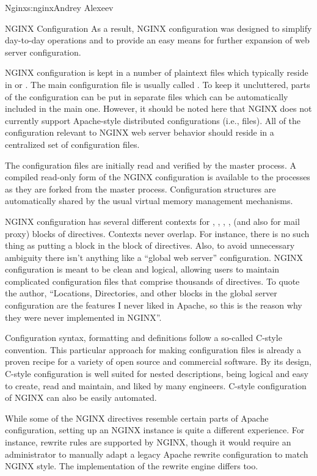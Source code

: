 \begin{aosachapter}{Nginx}{s:nginx}{Andrey Alexeev}
\begin{aosasect1}{NGINX Configuration}
As a result, NGINX configuration was designed to simplify day-to-day
operations and to provide an easy means for further expansion of web
server configuration.

NGINX configuration is kept in a number of plaintext files which
typically reside in  or
. The main configuration file is usually called
. To keep it uncluttered, parts of the configuration
can be put in separate files which can be automatically included in
the main one. However, it should be noted here that NGINX does not
currently support Apache-style distributed configurations (i.e.,
 files). All of the configuration relevant to NGINX
web server behavior should reside in a centralized set of
configuration files.

The configuration files are initially read and verified by the master
process. A compiled read-only form of the NGINX configuration is
available to the  processes as they are forked from the
master process. Configuration structures are automatically shared by
the usual virtual memory management mechanisms.

NGINX configuration has several different contexts for ,
, , ,  (and also
 for mail proxy) blocks of directives. Contexts never
overlap. For instance, there is no such thing as putting a
 block in the  block of directives. Also, to
avoid unnecessary ambiguity there isn't anything like a ``global web
server'' configuration. NGINX configuration is meant to be clean and
logical, allowing users to maintain complicated configuration files
that comprise thousands of directives. To quote the author,
``Locations, Directories, and other blocks in the global server
configuration are the features I never liked in Apache, so this is the
reason why they were never implemented in NGINX''.

Configuration syntax, formatting and definitions follow a so-called
C-style convention. This particular approach for making configuration
files is already a proven recipe for a variety of open source and
commercial software. By its design, C-style configuration is well
suited for nested descriptions, being logical and easy to create, read
and maintain, and liked by many engineers. C-style configuration of
NGINX can also be easily automated.

While some of the NGINX directives resemble certain parts of Apache
configuration, setting up an NGINX instance is quite a different
experience. For instance, rewrite rules are supported by NGINX, though
it would require an administrator to manually adapt a legacy Apache
rewrite configuration to match NGINX style. The implementation of the
rewrite engine differs too.


\end{aosasect1}
\end{aosachapter}
